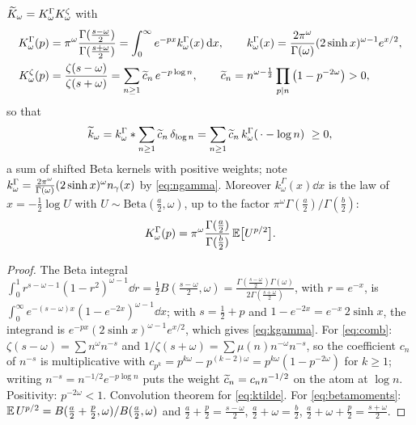 \begin{proposition}\label{prop:pieces}
$\widetilde K_\omega=K^\Gamma_\omega K^\zeta_\omega$ with
\begin{align}
 K^\Gamma_\omega(p)&=\pi^\omega\frac{\Gamma(\frac{s-\omega}2)}{\Gamma(\frac{s+\omega}2)}
 =\int_0^\infty e^{-px}k^\Gamma_\omega(x)\,\mathrm d x,\qquad
 k^\Gamma_\omega(x)=\frac{2\pi^\omega}{\Gamma(\omega)}(2\sinh x)^{\omega-1}e^{x/2},
 \label{eq:kgamma}\\
 K^\zeta_\omega(p)&=\frac{\zeta(s-\omega)}{\zeta(s+\omega)}=\sum_{n\geq1}\widetilde c_n\,e^{-p\log n},\qquad
 \widetilde c_n=n^{\omega-\frac12}\prod_{p\mid n}\big(1-p^{-2\omega}\big)>0 ,
 \label{eq:comb}
\end{align}
so that
\begin{equation}\label{eq:ktilde}
 \widetilde k_\omega=k^\Gamma_\omega*\sum_{n\geq1}\widetilde c_n\,\delta_{\log n}
 =\sum_{n\geq1}\widetilde c_n\,k^\Gamma_\omega(\,\cdot-\log n)\ \geq0 ,
\end{equation}
a sum of shifted Beta kernels with positive weights; note
$k^\Gamma_\omega=\frac{2\pi^\omega}{\Gamma(\omega)}(2\sinh x)^{\omega}n_{\gamma}(x)$
by \eqref{eq:ngamma}. Moreover
$k^\Gamma_\omega(x)\dd x$ is the law of $x=-\frac12\log U$ with
$U\sim\mathrm{Beta}(\frac a2,\omega)$, up to the factor
$\pi^\omega\Gamma(\frac a2)/\Gamma(\frac b2)$:
\begin{equation}\label{eq:betamoments}
 K^\Gamma_\omega(p)=\pi^\omega\frac{\Gamma(\frac a2)}{\Gamma(\frac b2)}\,\mathbb E\big[U^{p/2}\big].
\end{equation}
\end{proposition}
\begin{proof}
The Beta integral $\int_0^1r^{s-\omega-1}(1-r^2)^{\omega-1}\dd r
=\frac12B(\frac{s-\omega}2,\omega)
=\frac{\Gamma(\frac{s-\omega}2)\Gamma(\omega)}{2\Gamma(\frac{s+\omega}2)}$,
with $r=e^{-x}$, is $\int_0^\infty e^{-(s-\omega)x}(1-e^{-2x})^{\omega-1}\dd x$;
with $s=\frac12+p$ and $1-e^{-2x}=e^{-x}\,2\sinh x$, the integrand is
$e^{-px}(2\sinh x)^{\omega-1}e^{x/2}$, which gives \eqref{eq:kgamma}. For
\eqref{eq:comb}: $\zeta(s-\omega)=\sum n^{\omega}n^{-s}$ and
$1/\zeta(s+\omega)=\sum\mu(n)n^{-\omega}n^{-s}$, so the coefficient $c_n$ of
$n^{-s}$ is multiplicative with $c_{p^k}=p^{k\omega}-p^{(k-2)\omega}=p^{k\omega}(1-p^{-2\omega})$
for $k\geq1$; writing $n^{-s}=n^{-1/2}e^{-p\log n}$ puts the weight
$\widetilde c_n=c_nn^{-1/2}$ on the atom at $\log n$. Positivity: $p^{-2\omega}<1$.
Convolution theorem for \eqref{eq:ktilde}. For \eqref{eq:betamoments}:
$\mathbb E\,U^{p/2}=B(\frac a2+\frac p2,\omega)/B(\frac a2,\omega)$ and
$\frac a2+\frac p2=\frac{s-\omega}2$, $\frac a2+\omega=\frac b2$,
$\frac a2+\omega+\frac p2=\frac{s+\omega}2$.
\end{proof}

